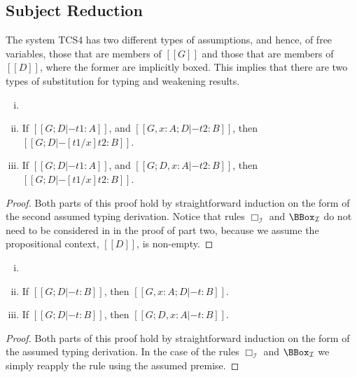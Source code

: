\subsection{Subject Reduction}
\label{subsec:subject_reduction}
The system TCS4 has two different types of assumptions, and hence, of
free variables, those that are members of $[[G]]$ and those that are
members of $[[D]]$, where the former are implicitly boxed.  This
implies that there are two types of substitution for typing and
weakening results.
\begin{lemma}
  \label{lemma:substitution_for_typing}
  \begin{enumerate}[i.]
  \item[] 
  \item If $[[G;D |- t1 : A]]$, and $[[G, x : A; D |- t2 : B]]$, then $[[G;D |- [t1/x]t2 : B]]$.
  \item If $[[G;D |- t1 : A]]$, and $[[G; D, x : A |- t2 : B]]$, then $[[G;D |- [t1/x]t2 : B]]$.
  \end{enumerate}
\end{lemma}
\begin{proof}
  Both parts of this proof hold by straightforward induction on the
  form of the second assumed typing derivation.  Notice that rules
  $\Box_{\mathcal{I}}$ and $\BBox_{\mathcal{I}}$ do not need to be
  considered in in the proof of part two, because we assume the
  propositional context, $[[D]]$, is non-empty.
\end{proof}

\begin{lemma}[Weakening]
  \label{lemma:weakening}
  \begin{enumerate}[i.]
  \item[]
  \item If $[[G;D |- t : B]]$, then $[[G,x : A; D |- t : B]]$.
  \item If $[[G;D |- t : B]]$, then $[[G; D,x : A |- t : B]]$.
  \end{enumerate}
\end{lemma}
\begin{proof}
  Both parts of this proof hold by straightforward induction on the
  form of the assumed typing derivation.  In the case of the rules
  $\Box_{\mathcal{I}}$ and $\BBox_{\mathcal{I}}$ we simply reapply the
  rule using the assumed premise.
\end{proof}

